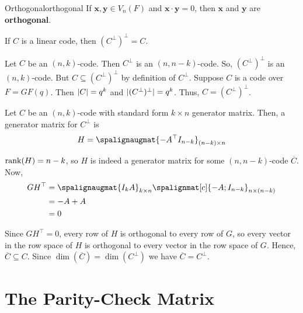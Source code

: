 
\begin{Definition}{Orthogonal}{orthogonal}
    If $ \symbf{x},\symbf{y}\in V_n(F) $ and $ \symbf{x}\cdot \symbf{y}=0 $, then
    $ \symbf{x} $ and $ \symbf{y} $ are \textbf{orthogonal}.
\end{Definition}

\begin{Theorem}{}{}
    If $ C $ is a linear code, then $ (C^{\perp})^{\perp}=C $.
\end{Theorem}

\begin{Proof}{}{}
    Let $ C $ be an $ (n,k) $-code. Then $ C^{\perp} $ is an $ (n,n-k) $-code.
    So, $ (C^{\perp})^{\perp} $ is an $ (n,k) $-code. But
    $ C\subseteq (C^{\perp})^{\perp} $ by definition of $ C^{\perp} $.
    Suppose $ C $ is a code over $ F=GF(q) $. Then $ \lvert C\rvert=q^k $
    and $ \lvert(C^{\perp})^{\perp}\rvert=q^k $. Thus, $ C=(C^{\perp})^{\perp} $.
\end{Proof}

\begin{Theorem}{}{}
    Let $ C $ be an $ (n,k) $-code with standard form $ k\times n $ generator matrix.
    Then, a generator matrix for $ C^{\perp} $ is
    \[ H=\spalignaugmat{-A^{\top} I_{n-k}}_{(n-k)\times n} \]
\end{Theorem}

\begin{Proof}{}{}
    $ \operatorname{rank}(H)=n-k $, so $ H $ is indeed a generator matrix for some $ (n,n-k) $-code
    $ \overline{C} $. Now,
    \begin{align*}
        GH^{\top}
         & = \spalignaugmat{I_k A}_{k\times n}\spalignmat[c]{-A; I_{n-k}}_{n\times(n-k)} \\
         & =-A+A                                                                         \\
         & =0
    \end{align*}

    Since $ GH^{\top}=0 $, every row of $ H $ is orthogonal to every row of $ G $,
    so every vector in the row space of $ H $ is orthogonal to every vector in
    the row space of $ G $. Hence, $ \overline{C}\subseteq C $. Since
    $ \dim(\overline{C})=\dim(C^{\perp}) $ we have $ \overline{C}=C^{\perp} $.
\end{Proof}

\section{The Parity-Check Matrix}

